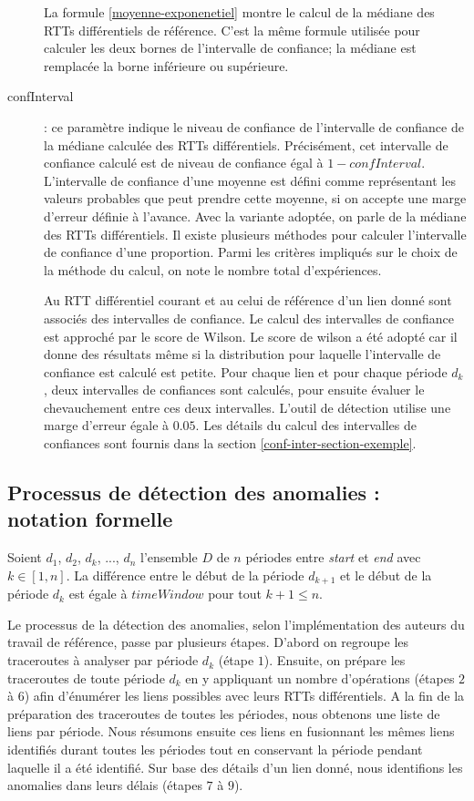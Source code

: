 \begin{description}
	La formule \ref{moyenne-exponenetiel} montre le calcul de la médiane des RTTs différentiels de référence. C'est la même formule utilisée pour calculer les deux bornes de l'intervalle de confiance; la médiane est remplacée la borne inférieure ou supérieure.
	
	\item[confInterval] : ce paramètre indique le niveau de confiance de l'intervalle de confiance de la médiane calculée des RTTs différentiels. Précisément, cet intervalle de confiance calculé est de niveau de confiance égal à $ 1 - confInterval $.  L'intervalle de confiance d'une moyenne  est défini comme représentant les valeurs probables que peut prendre cette moyenne, si on accepte une marge d'erreur définie à l'avance. Avec la variante adoptée, on parle de la médiane des RTTs différentiels. Il existe plusieurs méthodes pour calculer l'intervalle de confiance d'une proportion. Parmi les critères impliqués sur le choix de la méthode du calcul, on note le nombre total d'expériences.
	
	Au RTT différentiel courant et  au celui de référence d'un lien donné sont associés des intervalles de confiance.  Le calcul des intervalles de confiance  est approché par le score de Wilson. Le score de wilson a été adopté car il donne des résultats même si la distribution pour laquelle l'intervalle de confiance est calculé est petite. Pour chaque lien et pour chaque période $d_k$,  deux intervalles de confiances sont calculés, pour ensuite évaluer le chevauchement entre ces deux intervalles. L'outil de détection utilise une marge d'erreur égale à  $ 0.05 $. Les détails du calcul des intervalles de confiances sont fournis dans la section \ref{conf-inter-section-exemple}.
\end{description}


\subsection{Processus de  détection des anomalies  : notation formelle}\label{steps-rtt-analysis}

Soient $ d_1 $, $  d_2 $, $d_k$, ..., $ d_n $ l'ensemble $D$ de $n$ périodes entre \textit{start} et \textit{end} avec $k \in [1,n]$. La différence entre le début de la période $ d_{k+1} $ et le début de la période $ d_k $ est égale à $timeWindow$ pour tout $k+1 \leq n $.  

Le processus de la détection des anomalies, selon l'implémentation \cite{InternetHealthReport} des auteurs du travail de référence,  passe par plusieurs étapes. D'abord on  regroupe les traceroutes à analyser par période $d_k$ (étape $ 1 $). Ensuite, on prépare les traceroutes de toute  période $d_k$ en y appliquant un nombre d'opérations (étapes  $ 2 $ à $ 6 $) afin d'énumérer les liens possibles avec leurs RTTs différentiels. A la fin de la préparation des traceroutes de toutes les périodes, nous obtenons une liste de liens par période. Nous résumons ensuite ces liens en fusionnant les mêmes liens identifiés durant toutes les périodes tout en conservant la période pendant laquelle il a été identifié. Sur base des détails d'un lien donné,  nous identifions les anomalies dans leurs délais (étapes $ 7 $ à $9$). 

